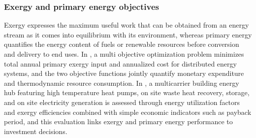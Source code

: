 \documentclass[12pt,a4paper]{report}
\begin{document}
\subsubsection{Exergy and primary energy objectives}

Exergy expresses the maximum useful work that can be obtained from an energy stream as it comes into equilibrium with its environment, whereas primary energy quantifies the energy content of fuels or renewable resources before conversion and delivery to end uses. In \cite{disomma2017multobjective}, a multi objective optimization problem minimizes total annual primary exergy input and annualized cost for distributed energy systems, and the two objective functions jointly quantify monetary expenditure and thermodynamic resource consumption. In \cite{kalina2024technical}, a multicarrier building energy hub featuring high temperature heat pumps, on site waste heat recovery, storage, and on site electricity generation is assessed through energy utilization factors and exergy efficiencies combined with simple economic indicators such as payback period, and this evaluation links exergy and primary energy performance to investment decisions. %


\end{document}
